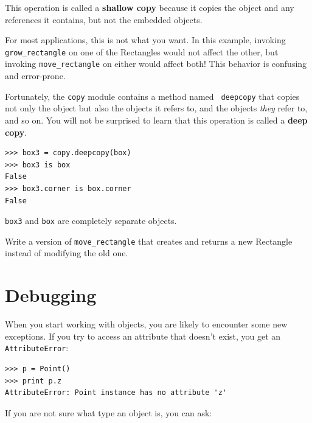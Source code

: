 \documentclass[10pt]{book}
\begin{document}
This operation is called a {\bf shallow copy} because it copies the
object and any references it contains, but not the embedded objects.


For most applications, this is not what you want.  In this example,
invoking \verb"grow_rectangle" on one of the Rectangles would not
affect the other, but invoking \verb"move_rectangle" on either would
affect both!  This behavior is confusing and error-prone.


Fortunately, the {\tt copy} module contains a method named {\tt
deepcopy} that copies not only the object but also 
the objects it refers to, and the objects {\em they} refer to,
and so on.
You will not be surprised to learn that this operation is
called a {\bf deep copy}.


\beforeverb
\begin{verbatim}
>>> box3 = copy.deepcopy(box)
>>> box3 is box
False
>>> box3.corner is box.corner
False
\end{verbatim}
\afterverb
%
{\tt box3} and {\tt box} are completely separate objects.


\begin{ex}
Write a version of \verb"move_rectangle" that creates and
returns a new Rectangle instead of modifying the old one.
\end{ex}


\section{Debugging}
\label{hasattr}


When you start working with objects, you are likely to encounter
some new exceptions.  If you try to access an attribute
that doesn't exist, you get an {\tt AttributeError}:


\beforeverb
\begin{verbatim}
>>> p = Point()
>>> print p.z
AttributeError: Point instance has no attribute 'z'
\end{verbatim}
\afterverb
%
If you are not sure what type an object is, you can ask:

\end{document}
